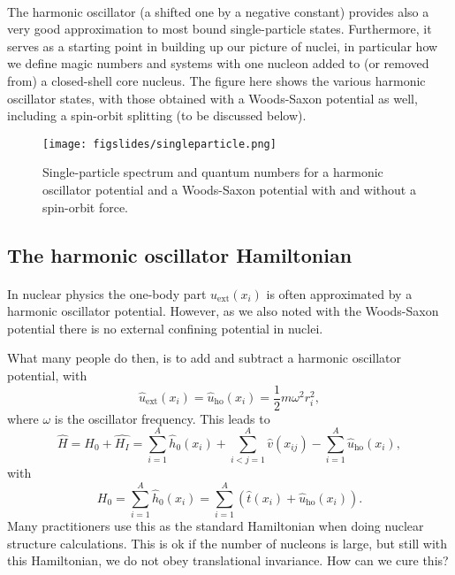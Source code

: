 \documentclass[%
twoside,                 %
final,                   %
10pt]{article}
\begin{document}
\paragraph{}
The harmonic oscillator (a shifted one by a negative constant) provides also a very good approximation to most bound single-particle states. Furthermore, it serves as a starting point in building up our picture of nuclei, in particular how we define magic numbers and systems with one nucleon added to (or removed from) a closed-shell core nucleus. The figure here shows 
the various harmonic oscillator states, with those obtained with a Woods-Saxon potential as well, including a spin-orbit splitting (to be discussed below).

\begin{figure}[ht]
  \centerline{\texttt{[image: figslides/singleparticle.png]}}
  \caption{
  Single-particle spectrum and quantum numbers for a harmonic oscillator potential and a Woods-Saxon potential with and without a spin-orbit force.
  }
\end{figure}









\subsection*{The harmonic oscillator Hamiltonian}

\paragraph{}
In nuclear physics the one-body part $u_{\mathrm{ext}}(x_i)$ is often 
approximated by a harmonic oscillator potential. However,  as we also noted with the Woods-Saxon potential there is no 
external confining potential in nuclei. 

What many people do then, is to add and subtract a harmonic oscillator potential,
with 
\[
\hat{u}_{\mathrm{ext}}(x_i)=\hat{u}_{\mathrm{ho}}(x_i)= \frac{1}{2}m\omega^2 r_i^2,
\]
where $\omega$ is the oscillator frequency. This leads to 
\[
    \hat{H} = \hat{H_0} + \hat{H_I} 
    = \sum_{i=1}^A \hat{h}_0(x_i) + \sum_{i < j=1}^A \hat{v}(x_{ij})-\sum_{i=1}^A\hat{u}_{\mathrm{ho}}(x_i),
\]
with 
\[
  H_0=\sum_{i=1}^A \hat{h}_0(x_i) =  \sum_{i=1}^A\left(\hat{t}(x_i) + \hat{u}_{\mathrm{ho}}(x_i)\right).
\]
Many practitioners use this as the standard Hamiltonian when doing nuclear structure calculations. 
This is ok if the number of nucleons is large, but still with this Hamiltonian, we do not obey translational invariance.  How can we cure this?
\end{document}

